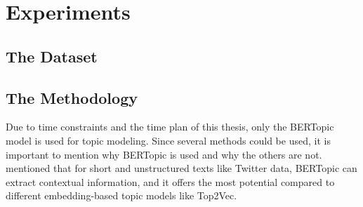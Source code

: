 
\chapter{Experiments}\label{chapter:experiments}

\section{The Dataset}
\parencite{secim2023}

\section{The Methodology}
Due to time constraints and the time plan of this thesis, only the BERTopic model 
is used for topic modeling. Since several methods could be used, it is important 
to mention why BERTopic is used and why the others are not.
\textcite{topic_model_comparison_bertopic_2022} mentioned that for short and 
unstructured texts like Twitter data, BERTopic can extract contextual information, 
and it offers the most potential compared to different embedding-based topic models like Top2Vec.
